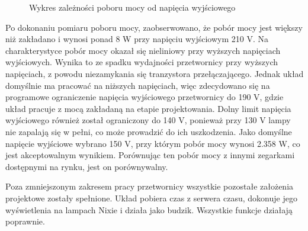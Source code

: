 \documentclass[../main.tex]{subfiles}
\begin{document}
\begin{figure}[H]
  \centering
  \caption{Wykres zależności poboru mocy od napięcia wyjściowego}
  \label{fig:power}
\end{figure}

Po dokonaniu pomiaru poboru mocy, zaobserwowano, że pobór mocy jest większy niż zakładano i wynosi ponad 8 W przy napięciu wyjściowym 210 V.
Na charakterystyce pobór mocy okazał się nieliniowy przy wyższych napięciach wyjściowych. Wynika to ze spadku wydajności przetwornicy przy wyższych napięciach,
z powodu niezamykania się tranzystora przełączającego. Jednak układ domyślnie ma pracować na niższych napięciach, więc 
zdecydowano się na programowe ograniczenie napięcia wyjściowego przetwornicy do 190 V, gdzie układ pracuje z mocą zakładaną na etapie projektowania. Dolny limit napięcia wyjściowego również
został ograniczony do 140 V, ponieważ przy 130 V lampy nie zapalają się w pełni, co może prowadzić do ich uszkodzenia. 
Jako domyślne napięcie wyjściowe wybrano 150 V, przy którym pobór mocy wynosi 2.358 W, co jest akceptowalnym wynikiem.
Porównując ten pobór mocy z innymi zegarkami dostępnymi na rynku, jest on porównywalny.

Poza zmniejszonym zakresem pracy przetwornicy wszystkie pozostałe założenia projektowe zostały spełnione. Układ 
pobiera czas z serwera czasu, dokonuje jego wyświetlenia na lampach Nixie i działa jako budzik. Wszystkie funkcje działają poprawnie.
\end{document}
